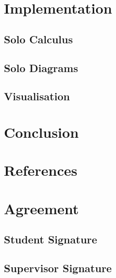 \documentclass{article}
\begin{document}
    \section{Implementation}
        \subsection{Solo Calculus}
        \subsection{Solo Diagrams}
        \subsection{Visualisation}

    \section{Conclusion}

    \section{References}
        

    \section{Agreement}
        \subsection{Student Signature}
            \vspace{1in}

        \subsection{Supervisor Signature}
            \vspace{1in}
\end{document}
